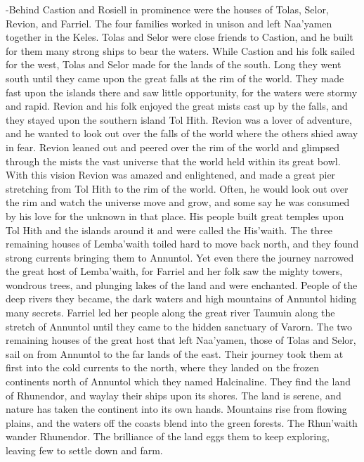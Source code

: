 \documentclass[smalldemyvopaper,11pt,twoside,onecolumn,openright,extrafontsizes]{memoir}
\begin{document}
-Behind Castion and Rosiell in prominence were the houses of Tolas, Selor, Revion, and Farriel. The four families worked in unison and left Naa’yamen together in the Keles. Tolas and Selor were close friends to Castion, and he built for them many strong ships to bear the waters. While Castion and his folk sailed for the west, Tolas and Selor made for the lands of the south. Long they went south until they came upon the great falls at the rim of the world. They made fast upon the islands there and saw little opportunity, for the waters were stormy and rapid. Revion and his folk enjoyed the great mists cast up by the falls, and they stayed upon the southern island Tol Hith. Revion was a lover of adventure, and he wanted to look out over the falls of the world where the others shied away in fear. Revion leaned out and peered over the rim of the world and glimpsed through the mists the vast universe that the world held within its great bowl. With this vision Revion was amazed and enlightened, and made a great pier stretching from Tol Hith to the rim of the world. Often, he would look out over the rim and watch the universe move and grow, and some say he was consumed by his love for the unknown in that place. His people built great temples upon Tol Hith and the islands around it and were called the His’waith. The three remaining houses of Lemba’waith toiled hard to move back north, and they found strong currents bringing them to Annuntol. Yet even there the journey narrowed the great host of Lemba’waith, for Farriel and her folk saw the mighty towers, wondrous trees, and plunging lakes of the land and were enchanted. People of the deep rivers they became, the dark waters and high mountains of Annuntol hiding many secrets. Farriel led her people along the great river Taumuin along the stretch of Annuntol until they came to the hidden sanctuary of Varorn.
The two remaining houses of the great host that left Naa’yamen, those of Tolas and Selor, sail on from Annuntol to the far lands of the east. Their journey took them at first into the cold currents to the north, where they landed on the frozen continents north of Annuntol which they named Halcinaline. They find the land of Rhunendor, and waylay their ships upon its shores. The land is serene, and nature has taken the continent into its own hands. Mountains rise from flowing plains, and the waters off the coasts blend into the green forests. The Rhun’waith wander Rhunendor. The brilliance of the land eggs them to keep exploring, leaving few to settle down and farm. 
\end{document}
